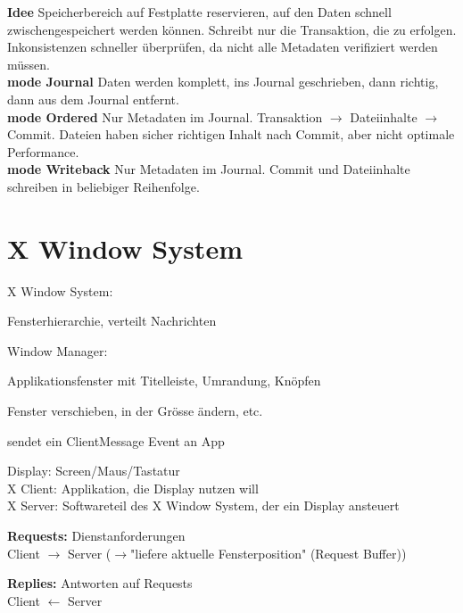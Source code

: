\begin{multicols*}{5}
\textbf{Idee} Speicherbereich auf Festplatte reservieren, auf den Daten schnell zwischengespeichert werden können. Schreibt nur die Transaktion, die zu erfolgen. Inkonsistenzen schneller überprüfen, da nicht alle Metadaten verifiziert werden müssen.\\
\textbf{mode Journal} Daten werden komplett, ins Journal geschrieben, dann richtig, dann aus dem Journal entfernt.\\
\textbf{mode Ordered} Nur Metadaten im Journal. Transaktion $\rightarrow$ Dateiinhalte $\rightarrow$ Commit. Dateien haben sicher richtigen Inhalt nach Commit, aber nicht optimale Performance.\\
\textbf{mode Writeback} Nur Metadaten im Journal. Commit und Dateiinhalte schreiben in beliebiger Reihenfolge.
 
 
\vspace{-5pt}
 

\section{X Window System}

\textcolor{h}{X Window System:}
\begin{compactitem}[$\bullet$]
\item Fensterhierarchie, verteilt Nachrichten
\end{compactitem}

\textcolor{h}{Window Manager:}
\begin{compactitem}[$\bullet$]
\item Applikationsfenster mit Titelleiste, Umrandung, Knöpfen	
\item Fenster verschieben, in der Grösse ändern, etc.
\item sendet ein ClientMessage Event an App
\end{compactitem}


\textcolor{h}{Display:} Screen/Maus/Tastatur\\
\textcolor{h}{X Client:} Applikation, die Display nutzen will\\
\textcolor{h}{X Server:} Softwareteil des X Window System, der ein Display ansteuert

\textbf{Requests:} Dienstanforderungen\\
Client $\rightarrow$ Server ($\rightarrow$"liefere aktuelle Fensterposition" (Request Buffer))

\textbf{Replies:} Antworten auf Requests\\
Client $\leftarrow$ Server


\end{multicols*}
